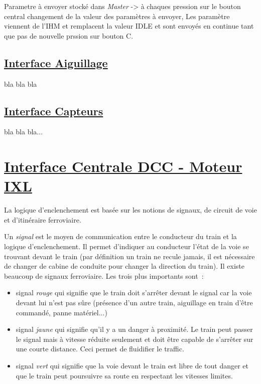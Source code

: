 Parametre à envoyer stocké dans \emph{Master}\hfill\linebreak
-> à chaques pression sur le bouton central changement de la valeur\linebreak
des paramètres à envoyer, Les paramètre viennent de l'IHM et\linebreak
remplacent la valeur IDLE et sont envoyés en continue tant que pas de\linebreak
nouvelle prssion sur bouton C.\linebreak
\bigskip

\subsection{\underline{Interface Aiguillage}}
\label{sec:int_aig}

bla bla bla

\subsection{\underline{Interface Capteurs}}
\label{sec:int_cap}

bla bla bla...


\newpage
\section{\underline{Interface Centrale DCC - Moteur IXL}}
\label{sec:int_ixl}   

La logique d'enclenchement est basée sur les notions de signaux, de
circuit de voie et d'itinéraire ferroviaire.

Un \emph{signal} est le moyen de communication entre le conducteur du
train et la logique d'enclenchement.  Il permet d'indiquer au
conducteur l'état de la voie se trouvant devant le train (par
définition un train ne recule jamais, il est nécessaire de changer de
cabine de conduite pour changer la direction du train). Il existe
beaucoup de signaux ferroviaire. Les trois plus importants sont~:
\begin{itemize}
\item signal \emph{rouge} qui signifie que le train doit s'arrêter
  devant le signal car la voie devant lui n'est pas sûre (présence
  d'un autre train, aiguillage en train d'être commandé, panne
  matériel...)
\item signal \emph{jaune} qui signifie qu'il y a un danger à
  proximité. Le train peut passer le signal mais à vitesse réduite
  seulement et doit être capable de s'arrêter sur une courte
  distance. Ceci permet de fluidifier le traffic.
\item signal \emph{vert} qui signifie que la voie devant le train est
  libre de tout danger et que le train peut poursuivre sa route en
  respectant les vitesses limites.
\end{itemize}

